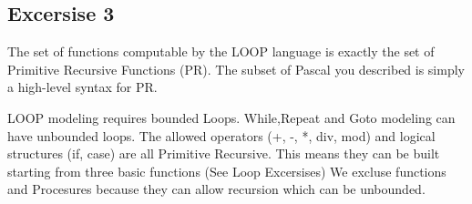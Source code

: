 \documentclass[11pt,a4paper]{article}
\begin{document}
\subsection*{Excersise 3}

The set of functions computable by the LOOP language is exactly the set of Primitive Recursive Functions (PR). 
The subset of Pascal you described is simply a high-level syntax for PR.

LOOP modeling requires bounded Loops. While,Repeat and Goto modeling can have unbounded loops.
The allowed operators (+, -, *, div, mod) and logical structures (if, case) are all Primitive Recursive.
This means they can be built starting from three basic functions (See Loop Excersises)
We excluse functions and Procesures because they can allow recursion which can be unbounded.
\end{document}
